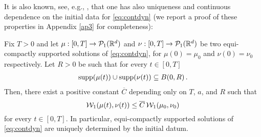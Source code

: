 It is also known, see, e.g., \cite{CanCarRos10}, that one has also uniqueness and continuous dependence on the initial data for \eqref{eq:contdyn} (we report a proof of these properties in Appendix \ref{ap3} for completeness):

\begin{theorem}\label{uniq}
Fix $T>0$  and let $\mu:[0,T]\rightarrow\mathcal{P}_1(\mathbb{R}^d)$ and $\nu:[0,T]\rightarrow\mathcal{P}_1(\mathbb{R}^d)$ be two equi-compactly supported solutions  of \eqref{eq:contdyn}, for $\mu(0)=\mu_0$ and $\nu(0)=\nu_0$ respectively. Let $R>0$ be such that for every $t \in[0, T]$
\begin{align}\label{supptot}
\operatorname{supp}(\mu(t))\cup\operatorname{supp}(\nu(t)) \subseteq B(0, R)\,.
\end{align}
Then, there exist a positive constant $\overline{C}$ depending only on $T$, $a$,  and $R$ such that
\begin{equation}\label{stab}
\mathcal{W}_1(\mu(t), \nu(t)) \le \overline{C} \, \mathcal{W}_1(\mu_0, \nu_0)
\end{equation}
for every $t \in [0, T]$. In particular, equi-compactly supported solutions of \eqref{eq:contdyn} are uniquely determined by the initial datum.
\end{theorem}

